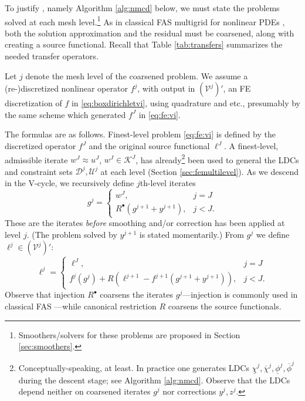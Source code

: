 \documentclass[letterpaper,final,12pt,reqno]{amsart}
\theoremstyle{cstyle}
\theoremstyle{cstyle*}
\theoremstyle{dstyle}
\numberwithin{equation}{section}
\numberwithin{figure}{section}
\numberwithin{table}{section}
\numberwithin{theorem}{section}
\newcommand{\cV}{\mathcal{V}}
\newcommand{\iR}{R^{\bullet}}
\begin{document}
To justify \fascd, namely Algorithm \ref{alg:nmcd} below, we must state the problems solved at each mesh level.\footnote{Smoothers/solvers for these problems are proposed in Section \ref{sec:smoothers}.}  As in classical FAS multigrid for nonlinear PDEs \cite{BrandtLivne2011,Bruneetal2015,Trottenbergetal2001}, both the solution approximation and the residual must be coarsened, along with creating a source functional.  Recall that Table \ref{tab:transfers} summarizes the needed transfer operators.

Let $j$ denote the mesh level of the coarsened problem.  We assume a (re-)discretized nonlinear operator $f^j$, with output in $(\cV^j)'$, an FE discretization of $f$ in \eqref{eq:boxdirichletvi}, using quadrature and etc., presumably by the same scheme which generated $f^J$ in \eqref{eq:fe:vi}.

The formulas are as follows.  Finest-level problem \eqref{eq:fe:vi} is defined by the discretized operator $f^J$ and the original source functional $\ell^J$.  A finest-level, admissible iterate $w^J \approx u^J$, $w^J \in \mathcal{K}^J$, has already\footnote{Conceptually-speaking, at least.  In practice one generates LDCs $\underline{\chi}^j,\overline{\chi}^j,\underline{\phi}^j,\overline{\phi}^j$ during the descent stage; see Algorithm \ref{alg:nmcd}.  Observe that the LDCs depend neither on coarsened iterates $g^j$ nor corrections $y^j,z^j$.} been used to general the LDCs and constraint sets $\mathcal{D}^j,\mathcal{U}^j$ at each level (Section \ref{sec:femultilevel}).  As we descend in the V-cycle, we recursively define $j$th-level iterates
\begin{equation}
g^j = \begin{cases} w^J, & j=J \\
                    \iR(g^{j+1} + y^{j+1}), & j < J.
      \end{cases}  \label{eq:fe:defineg}
\end{equation}
These are the iterates \emph{before} smoothing and/or correction has been applied at level $j$.  (The problem solved by $y^{j+1}$ is stated momentarily.)  From $g^j$ we define $\ell^j \in (\cV^j)'$:
\begin{equation}
\ell^j = \begin{cases} \ell^J, & j=J \\
                       f^j(g^j) + R\left(\ell^{j+1}-f^{j+1}(g^{j+1}+y^{j+1})\right), & j<J. \end{cases} \label{eq:fe:levelsource}
\end{equation}
Observe that injection $\iR$ coarsens the iterates $g^j$---injection is commonly used in classical FAS \cite[section 5.3]{Trottenbergetal2001}---while canonical restriction $R$ coarsens the source functionals.
\end{document}
